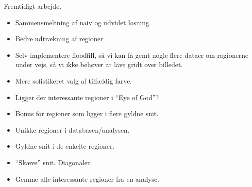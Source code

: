 {
{\sffamily Fremtidigt arbejde.
}

\begin{itemize}
    \item Sammensmeltning af naiv og udvidet løsning.
    \item Bedre udtrækning af regioner
    \item Selv implementere floodfill, så vi kan få gemt nogle flere
    dataer om ragionerne under vejs, så vi ikke behøver at lave gridt
    over billedet.
    \item Mere sofistikeret valg af tilfældig farve.
    \item Ligger der interessante regioner i ``Eye of God''?
    \item Bonus for regioner som ligger i flere gyldne snit.
    \item Unikke regioner i databasen/analysen.
    \item Gyldne snit i de enkelte regioner.
    \item ``Skæve'' snit. Diagonaler.
    \item Gemme alle interessante regioner fra en analyse.
\end{itemize}

}

